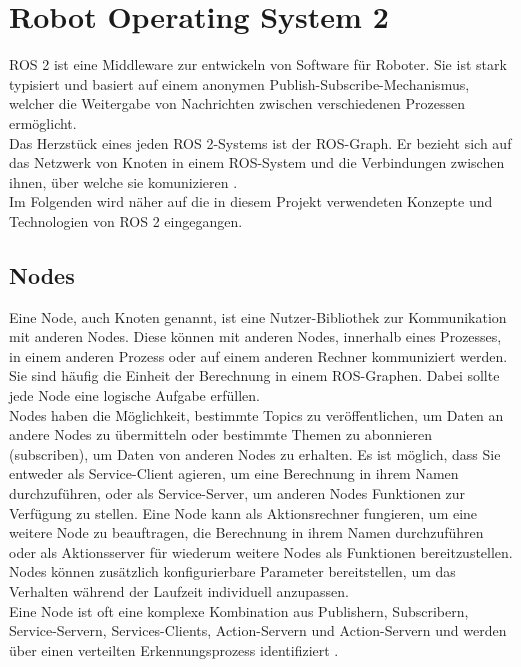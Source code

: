 \section{Robot Operating System 2}\label{sec:ROS2}
\ac{ROS} 2 ist eine Middleware zur entwickeln von Software für Roboter. Sie ist stark typisiert und basiert auf einem anonymen Publish-Subscribe-Mechanismus, welcher die Weitergabe von Nachrichten zwischen verschiedenen Prozessen ermöglicht.
\\

\noindent
Das Herzstück eines jeden \ac{ROS} 2-Systems ist der \ac{ROS}-Graph. Er bezieht sich auf das Netzwerk von Knoten in einem \ac{ROS}-System und die Verbindungen zwischen ihnen, über welche sie komunizieren \cite{ROSBasicConcepts}.
\\

\noindent
Im Folgenden wird näher auf die in diesem Projekt verwendeten Konzepte und Technologien von \ac{ROS} 2 eingegangen.\\

\subsection{Nodes}\label{subsec:ROS2Nodes}
Eine Node, auch Knoten genannt, ist eine Nutzer-Bibliothek zur Kommunikation mit anderen Nodes. Diese können mit anderen Nodes, innerhalb eines Prozesses, in einem anderen Prozess oder auf einem anderen Rechner kommuniziert werden. Sie sind häufig die Einheit der Berechnung in einem \ac{ROS}-Graphen. Dabei sollte jede Node eine logische Aufgabe erfüllen.
\\

\noindent
Nodes haben die Möglichkeit, bestimmte Topics zu veröffentlichen, um Daten an andere Nodes zu übermitteln oder bestimmte Themen zu abonnieren (subscriben), um Daten von anderen Nodes zu erhalten. Es ist möglich, dass Sie entweder als Service-Client agieren, um eine Berechnung in ihrem Namen durchzuführen, oder als Service-Server, um anderen Nodes Funktionen zur Verfügung zu stellen. Eine Node kann als Aktionsrechner fungieren, um eine weitere Node zu beauftragen, die Berechnung in ihrem Namen durchzuführen oder als Aktionsserver für wiederum weitere Nodes als Funktionen bereitzustellen. Nodes können zusätzlich konfigurierbare Parameter bereitstellen, um das Verhalten während der Laufzeit individuell anzupassen.
\\

\noindent
Eine Node ist oft eine komplexe Kombination aus Publishern, Subscribern, Service-Servern, Services-Clients, Action-Servern und Action-Servern und werden über einen verteilten Erkennungsprozess identifiziert \cite{ROSNodes}.
\\

